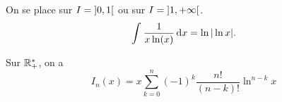 \documentclass{magnolia}
\begin{document}
\begin{sol}
\begin{questions}
\question On se place sur $I=\left]0,1\right[$ ou sur $I=\left]1,+\infty\right[$.
$$\int_{}^{} \frac{1}{x\ln(x)}\,\text{d}x=\ln|\ln x|.$$

\question Sur $\mathbb{R}_+^*$, on a
\[I_n(x)=x\sum_{k=0}^n (-1)^k \frac{n!}{(n-k)!}\ln^{n-k} x\]   
\end{questions}
\end{sol}

\end{document}
